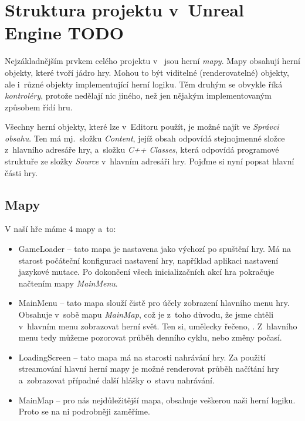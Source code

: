 
\section{Struktura projektu v~Unreal Engine TODO}
\label{sec:ueStructure}

Nejzákladnějším prvkem celého projektu v~\UEu{} jsou herní \textit{mapy}. Mapy obsahují herní objekty, které tvoří jádro hry. Mohou to být viditelné (renderovatelné) objekty, ale i~různé objekty implementující herní logiku. Těm druhým se obvykle říká \textit{kontroléry}, protože nedělají nic jiného, než jen nějakým implementovaným způsobem řídí hru.

Všechny herní objekty, které lze v~Editoru použít, je možné najít ve \textit{Správci obsahu}. Ten má mj.~složku \textit{Content}, jejíž obsah odpovídá stejnojmenné složce z~hlavního adresáře hry, a~složku \textit{C++ Classes}, která odpovídá programové struktuře ze složky \textit{Source} v~hlavním adresáři hry. Pojďme si nyní popsat hlavní části hry.


\subsection{Mapy}

V naší hře máme 4 mapy a~to:

\begin{itemize}
	\item GameLoader -- tato mapa je nastavena jako výchozí po spuštění hry. Má na starost počáteční konfiguraci nastavení hry, například aplikaci nastavení jazykové mutace. Po dokončení všech inicializačních akcí hra pokračuje načtením mapy \textit{MainMenu}.
	\item MainMenu -- tato mapa slouží čistě pro účely zobrazení hlavního menu hry. Obsahuje v~sobě mapu \textit{MainMap}, což je z~toho důvodu, že jsme chtěli v~hlavním menu zobrazovat herní svět. Ten si, umělecky řečeno, . Z~hlavního menu tedy můžeme pozorovat průběh denního cyklu, nebo změny počasí.
	\item LoadingScreen -- tato mapa má na starosti nahrávání hry. Za použití streamování hlavní herní mapy je možné renderovat průběh načítání hry a~zobrazovat případné další hlášky o~stavu nahrávání.
	\item MainMap -- pro nás nejdůležitější mapa, obsahuje veškerou naši herní logiku. Proto se na ni podrobněji zaměříme.
\end{itemize}

